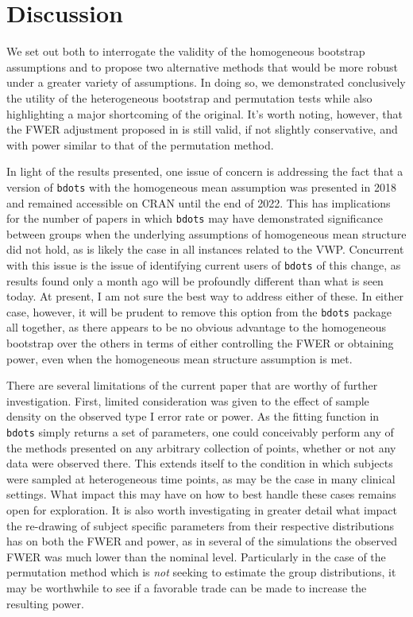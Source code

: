 \documentclass{article}
\newcommand{\xt}{\texttt}
\begin{document}
\section{Discussion}


We set out both to interrogate the validity of the homogeneous bootstrap assumptions and to propose two alternative methods that would be more robust under a greater variety of assumptions. In doing so, we demonstrated conclusively the utility of the heterogeneous bootstrap and permutation tests while also highlighting a major shortcoming of the original. It's worth noting, however, that the FWER adjustment proposed in \cite{oleson2017detecting} is still valid, if not slightly conservative, and with power similar to that of the permutation method. 

In light of the results presented, one issue of concern is addressing the fact that a version of \xt{bdots} with the homogeneous mean assumption was presented in 2018 and remained accessible on CRAN until the end of 2022. This has implications for the number of papers in which \xt{bdots} may have demonstrated significance between groups when the underlying assumptions of homogeneous mean structure did not hold, as is likely the case in all instances related to the VWP. Concurrent with this issue is the issue of identifying current users of \xt{bdots} of this change, as results found only a month ago will be profoundly different than what is seen today. At present, I am not sure the best way to address either of these. In either case, however, it will be prudent to remove this option from the \xt{bdots} package all together, as there appears to be no obvious advantage to the homogeneous bootstrap over the others in terms of either controlling the FWER or obtaining power, even when the homogeneous mean structure assumption is met.

There are several limitations of the current paper that are worthy of further investigation. First, limited consideration was given to the effect of sample density on the observed type I error rate or power. As the fitting function in \xt{bdots} simply returns a set of parameters, one could conceivably perform any of the methods presented on any arbitrary collection of points, whether or not any data were observed there. This extends itself to the condition in which subjects were sampled at heterogeneous time points, as may be the case in many clinical settings. What impact this may have on how to best handle these cases remains open for exploration. It is also worth investigating in greater detail what impact the re-drawing of subject specific parameters from their respective distributions has on both the FWER and power, as in several of the simulations the observed FWER was much lower than the nominal level. Particularly in the case of the permutation method which is \textit{not} seeking to estimate the group distributions, it may be worthwhile to see if a favorable trade can be made to increase the resulting power.
\end{document}
